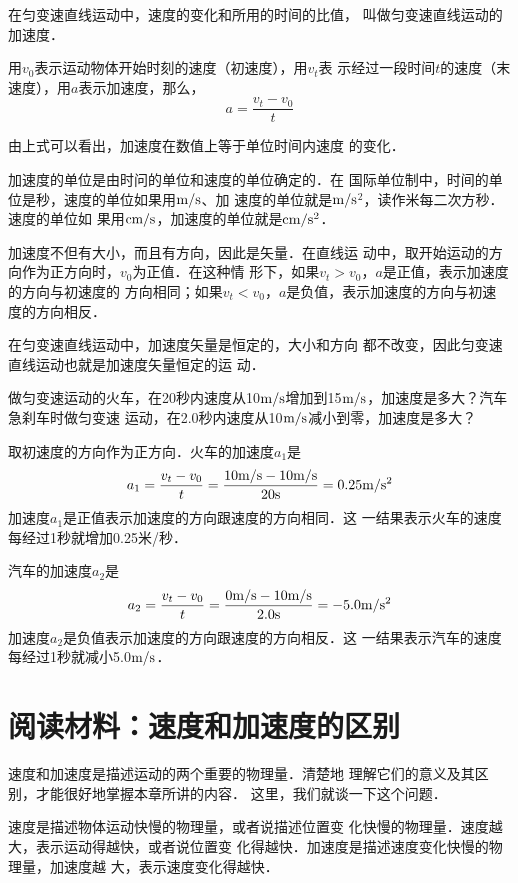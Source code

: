 在匀变速直线运动中，速度的变化和所用的时间的比值，
叫做匀变速直线运动的加速度．

用$v_0$表示运动物体开始时刻的速度（初速度），用$v_t$表
示经过一段时间$t$的速度（末速度），用$a$表示加速度，那么，
\[a=\frac{v_t-v_0}{t}\]

由上式可以看出，加速度在数值上等于单位时间内速度
的变化．

    加速度的单位是由时问的单位和速度的单位确定的．在
国际单位制中，时间的单位是秒，速度的单位如果用$\text{m}/\text{s}$、加
速度的单位就是$\text{m}/\text{s}$$^2$，读作米每二次方秒．速度的单位如
果用$\text{cm}/\text{s}$，加速度的单位就是$\text{cm}/\text{s}^2$．

    加速度不但有大小，而且有方向，因此是矢量．在直线运
动中，取开始运动的方向作为正方向时，$v_0$为正值．在这种情
形下，如果$v_t>v_0$，$a$是正值，表示加速度的方向与初速度的
方向相同；如果$v_t<v_0$，$a$是负值，表示加速度的方向与初速
度的方向相反．

    在匀变速直线运动中，加速度矢量是恒定的，大小和方向
都不改变，因此匀变速直线运动也就是加速度矢量恒定的运
动．

\begin{example}
做匀变速运动的火车，在20秒内速度从10$\text{m}/\text{s}$增加到15$\text{m}/\text{s}$，加速度是多大？汽车急刹车时做匀变速
运动，在2.0秒内速度从10$\text{m}/\text{s}$减小到零，加速度是多大？
\end{example}

\begin{solution}
取初速度的方向作为正方向．火车的加速度$a_1$是
\[a_1=\frac{v_t-v_0}{t}=\frac{10{\rm m/s}-10{\rm m/s}}{20{\rm s}}=0.25{\rm m/s^2} \]
加速度$a_1$是正值表示加速度的方向跟速度的方向相同．这
一结果表示火车的速度每经过1秒就增加0.25米/秒．

汽车的加速度$a_2$是
\[a_2=\frac{v_t-v_0}{t}=\frac{0{\rm m/s}-10{\rm m/s}}{2.0{\rm s}}=-5.0{\rm m/s^2} \]
加速度$a_2$是负值表示加速度的方向跟速度的方向相反．这
一结果表示汽车的速度每经过1秒就减小5.0$\text{m}/\text{s}$．

\end{solution}

\section*{阅读材料：速度和加速度的区别}
    速度和加速度是描述运动的两个重要的物理量．清楚地
理解它们的意义及其区别，才能很好地掌握本章所讲的内容．
这里，我们就谈一下这个问题．

    速度是描述物体运动快慢的物理量，或者说描述位置变
化快慢的物理量．速度越大，表示运动得越快，或者说位置变
化得越快．加速度是描述速度变化快慢的物理量，加速度越
大，表示速度变化得越快．

